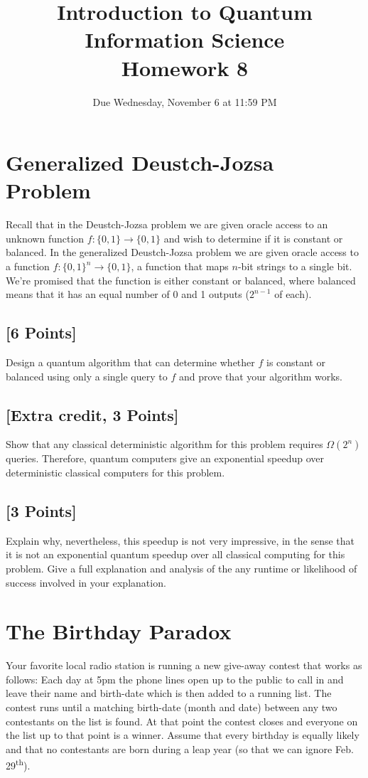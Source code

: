 \documentclass[11pt]{article}
\providecommand{\due}{Due Wednesday, November 6 at
11:59 PM}
\begin{document}
\title{Introduction to Quantum Information Science\\Homework 8}
\date{\due}
\maketitle
\section{Generalized Deustch-Jozsa Problem}
Recall that in the Deustch-Jozsa problem we are given oracle access to an unknown
function $f \colon \{0,1\} \to \{0,1\}$ and wish to determine if it is constant or
balanced. In the generalized Deustch-Jozsa problem we are given oracle access to a
function $f\colon \{0,1\}^n \to \{0,1\}$, a function that maps $n$-bit strings to a
single bit. We're promised that the function is either constant or balanced, where
balanced means that it has an equal number of 0 and 1 outputs ($2^{n-1}$ of each).
\subsection{[6 Points]}
Design a quantum algorithm that can determine whether $f$ is constant or balanced
using only a single query to $f$ and prove that your algorithm works.
\subsection{[Extra credit, 3 Points]}
Show that any classical deterministic algorithm for this problem requires $\Omega(2^n)$ queries. Therefore, quantum computers give an exponential speedup over
deterministic classical computers for this problem.
\subsection{[3 Points]} Explain why, nevertheless, this speedup is not very
impressive, in the sense that it is not an exponential quantum speedup over all
classical computing for this problem. Give a full explanation and analysis of the
any runtime or likelihood of success involved in your explanation.
\section{The Birthday Paradox}
 Your favorite local radio station is running a new give-away contest that works as follows: Each day at 5pm the phone lines open up to the public to call in and leave their name and birth-date which is then added to a running list. The contest runs until a matching birth-date (month and date) between any two contestants on the list is found. At that point the contest closes and everyone on the list up to that point is a winner. Assume that every birthday is equally likely and that no contestants are born during a leap year (so that we can ignore Feb. 29\textsuperscript{th}).  
\end{document}

